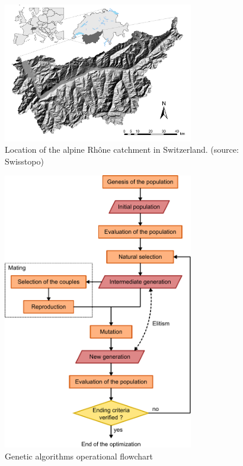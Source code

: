 \documentclass[twocol]{ametsoc}
\begin{document}
%


\begin{figure}[htb]
	\centerline{\includegraphics[width=8.3cm]{figures/figure_map.pdf}}
	\caption{Location of the alpine Rhône catchment in Switzerland. (source: Swisstopo)}
	\label{fig:map}
\end{figure}


\begin{figure}[htb]
	\centerline{\includegraphics[width=8.3cm]{figures/figure_structure_gas.pdf}}
	\caption{Genetic algorithms operational flowchart}
	\label{fig:structure_gas}
\end{figure}
\end{document}
